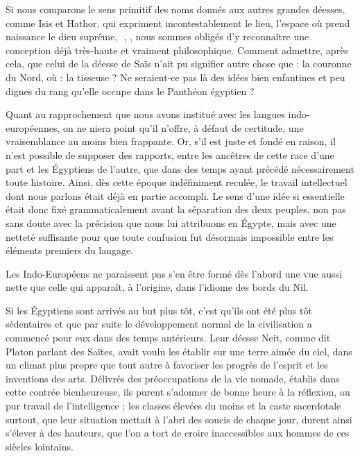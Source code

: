 \documentclass[a4paper, 11pt, oneside]{article}
\newcommand*\hieroAACB{\raisebox{0.5ex}{}}
\newcommand*\hieroAAHY{}
\newcommand*\hieroAARM{}
\begin{document}
Si nous comparons le sens primitif des noms donnés aux autres grandes déesses, comme Isis et Hathor, qui expriment incontestablement le lieu, l'espace où prend naissance le dieu suprême, $\hieroAAHY\:\hieroAACB$, $\hieroAARM$, nous sommes obligés d'y reconnaître une conception déjà très-haute et vraiment philosophique. Comment admettre, après cela, que celui de la déesse de Saïs n'ait pu signifier autre chose que : la couronne du Nord, où : la tisseuse ? Ne seraient-ce pas là des idées bien enfantines et peu dignes du rang qu'elle occupe dans le Panthéon égyptien ?

Quant au rapprochement que nous avons institué avec les langues indo-européennes, on ne niera point qu'il n'offre, à défaut de certitude, une vraisemblance au moins bien frappante. Or, s'il est juste et fondé en raison, il n'est possible de supposer des rapports, entre les ancêtres de cette race d'une part et les Égyptiens de l'autre, que dans des temps ayant précédé nécessairement toute histoire. Ainsi, dès cette époque indéfiniment reculée, le travail intellectuel dont nous parlons était déjà en partie accompli. Le sens d'une idée si essentielle était donc fixé grammaticalement avant la séparation des deux peuples, non pas sans doute avec la précision que nous lui attribuons en Égypte, mais avec une netteté suffisante pour que toute confusion fut désormais impossible entre les éléments premiers du langage.

Les Indo-Européens ne paraissent pas s'en être formé dès l'abord une vue aussi nette que celle qui apparaît, à l'origine, dans l'idiome des bords du Nil.

Si les Égyptiens sont arrivés au but plus tôt, c'est qu'ils ont été plus tôt sédentaires et que par suite le développement normal de la civilisation a commencé pour eux dans des temps antérieurs. Leur déesse Neit, comme dit Platon parlant des Saïtes, avait voulu les établir sur une terre aimée du ciel, dans un climat plus propre que tout autre à favoriser les progrès de l'esprit et les inventions des arts. Délivrés des préoccupations de la vie nomade, établis dans cette contrée bienheureuse, ils purent s'adonner de bonne heure à la réflexion, au pur travail de l'intelligence ; les classes élevées du moins et la caste sacerdotale surtout, que leur situation mettait à l'abri des soucis de chaque jour, durent ainsi s'élever à des hauteurs, que l'on a tort de croire inaccessibles aux hommes de ces siècles lointains.
\end{document}

